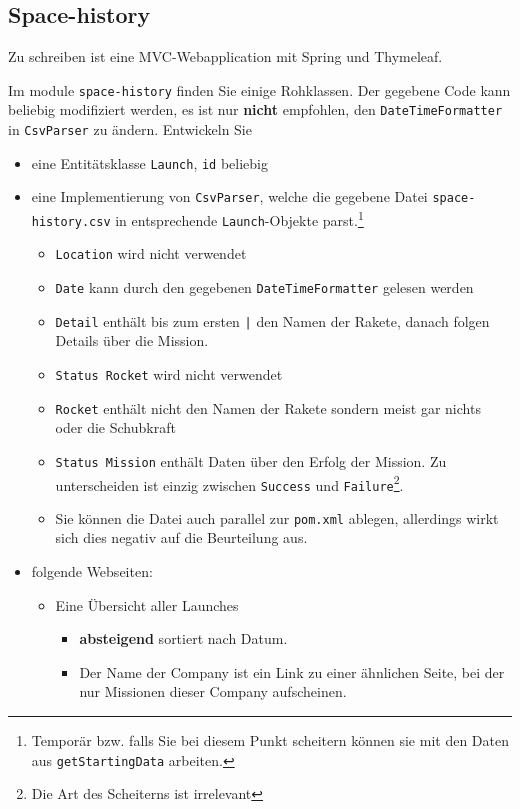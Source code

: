 \subsection{Space-history}
Zu schreiben ist eine MVC-Webapplication mit Spring und Thymeleaf.

Im module \texttt{space-history} finden Sie einige Rohklassen. Der gegebene Code kann beliebig modifiziert werden, es ist nur \textbf{nicht} empfohlen, den \texttt{DateTimeFormatter} in \texttt{CsvParser} zu ändern.
Entwickeln Sie 
\begin{itemize}
	\item eine Entitätsklasse \texttt{Launch}, \texttt{id} beliebig
	\item eine Implementierung von \texttt{CsvParser}, welche die gegebene Datei \texttt{space-history.csv} in entsprechende \texttt{Launch}-Objekte parst.\footnote{Temporär bzw. falls Sie bei diesem Punkt scheitern können sie mit den Daten aus \texttt{getStartingData} arbeiten.}
	\begin{itemize}
		\item \texttt{Location} wird nicht verwendet
		\item \texttt{Date} kann durch den gegebenen \texttt{DateTimeFormatter} gelesen werden
		\item \texttt{Detail} enthält bis zum ersten \texttt{|} den Namen der Rakete, danach folgen Details über die Mission. 
		\item \texttt{Status Rocket} wird nicht verwendet
		\item \texttt{Rocket} enthält nicht den Namen der Rakete sondern meist gar nichts oder die Schubkraft
		\item \texttt{Status Mission} enthält Daten über den Erfolg der Mission. Zu unterscheiden ist einzig zwischen \texttt{Success} und \texttt{Failure}\footnote{Die Art des Scheiterns ist irrelevant}.
		\item Sie können die Datei auch parallel zur \texttt{pom.xml} ablegen, allerdings wirkt sich dies negativ auf die Beurteilung aus.
	\end{itemize}
	\item folgende Webseiten:
	\begin{itemize}
		\item Eine Übersicht aller Launches
		\begin{itemize}
			\item \textbf{absteigend} sortiert nach Datum.
			\item Der Name der Company ist ein Link zu einer ähnlichen Seite, bei der nur Missionen dieser Company aufscheinen.

\end{itemize}
\end{itemize}
\end{itemize}
